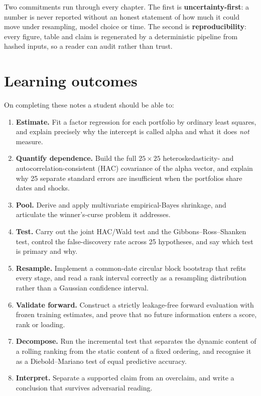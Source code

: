 Two commitments run through every chapter. The first is
\textbf{uncertainty-first}: a number is never reported without an honest
statement of how much it could move under resampling, model choice or
time. The second is \textbf{reproducibility}: every figure, table and
claim is regenerated by a deterministic pipeline from hashed inputs, so a
reader can audit rather than trust.

\hypertarget{learning-outcomes}{%
\section{Learning outcomes}\label{learning-outcomes}}

On completing these notes a student should be able to:

\begin{enumerate}
\tightlist
\item
  \textbf{Estimate.} Fit a factor regression for each portfolio by
  ordinary least squares, and explain precisely why the intercept is
  called alpha and what it does \emph{not} measure.
\item
  \textbf{Quantify dependence.} Build the full $25\times25$
  heteroskedasticity- and autocorrelation-consistent (HAC) covariance of
  the alpha vector, and explain why 25 separate standard errors are
  insufficient when the portfolios share dates and shocks.
\item
  \textbf{Pool.} Derive and apply multivariate empirical-Bayes shrinkage,
  and articulate the winner's-curse problem it addresses.
\item
  \textbf{Test.} Carry out the joint HAC/Wald test and the Gibbons--Ross--Shanken
  test, control the false-discovery rate across 25 hypotheses, and say
  which test is primary and why.
\item
  \textbf{Resample.} Implement a common-date circular block bootstrap
  that refits every stage, and read a rank interval correctly as a
  resampling distribution rather than a Gaussian confidence interval.
\item
  \textbf{Validate forward.} Construct a strictly leakage-free forward
  evaluation with frozen training estimates, and prove that no future
  information enters a score, rank or loading.
\item
  \textbf{Decompose.} Run the incremental test that separates the
  dynamic content of a rolling ranking from the static content of a fixed
  ordering, and recognise it as a Diebold--Mariano test of equal
  predictive accuracy.
\item
  \textbf{Interpret.} Separate a supported claim from an overclaim, and
  write a conclusion that survives adversarial reading.
\end{enumerate}

